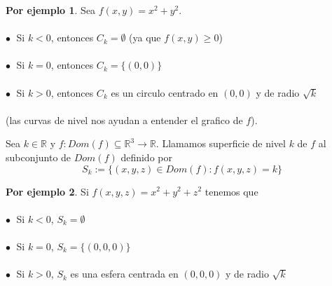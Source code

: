 \documentclass{article}
\theoremstyle{definition}
\theoremstyle{definition}
\newtheorem*{ej}{Por ejemplo}
\theoremstyle{remark}
\newcommand\bl{$\bullet\;$}
\begin{document}
\begin{ej}
Sea $f(x,y)=x^2+y^2$. \\\\
\textcolor{verdep2}{\bl} Si $k<0$, entonces $C_k = \emptyset$ \big(ya que $f(x,y) \geq 0$\big) \\\\
\textcolor{verdep2}{\bl} Si $k=0$, entonces $C_k=\{(0,0)\}$ \\\\ 
\textcolor{verdep2}{\bl} Si $k > 0$, entonces $C_k$ es un circulo centrado en $(0,0)$ y de radio $\sqrt{k}$\\\\ \big(las curvas de nivel nos ayudan a entender el grafico de $f$).
\end{ej}
  \begin{figure}[h]
\centering
\def\svgwidth{1\textwidth}
\makebox[\textwidth]{
}
\end{figure} \pagebreak
\begin{defi}
  Sea $k \in \mathbb{R}$ y $ f : Dom(f) \subseteq \mathbb{R}^3 \to \mathbb{R}$. Llamamos superficie de nivel $k$ de $f$ al subconjunto de $Dom(f)$ definido por \[
    S_k:=\big\{(x,y,z) \in Dom(f) : f(x,y,z)=k\big\}
  \]
\end{defi}
\begin{ej}
  Si $f(x,y,z)=x^2+y^2+z^2$ tenemos que \\\\
  \textcolor{verdep2}{\bl} Si $k<0$, $S_k=\emptyset$ \\\\
  \textcolor{verdep2}{\bl} Si $k=0$, $S_k=\big\{(0,0,0)\big\}$\\\\
  \textcolor{verdep2}{\bl} Si $k>0$, $S_k$ es una esfera centrada en $(0,0,0)$ y de radio $\sqrt{k}$
\end{ej}
\end{document}

